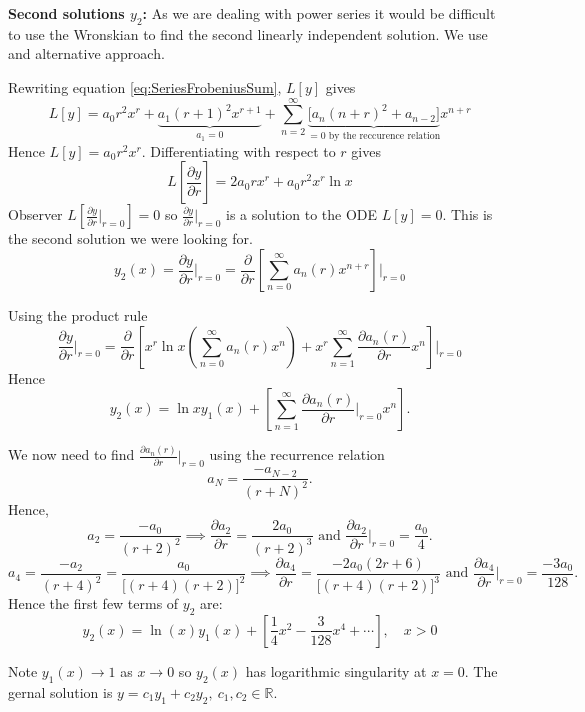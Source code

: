 \documentclass{article}
\theoremstyle{plain}
\theoremstyle{definition}
\numberwithin{equation}{section}
\begin{document}
\begin{tcolorbox}
        \textbf{Second solutions $y_2$:} As we are dealing with power series it would be difficult to use the Wronskian to find the second linearly independent solution. We use and alternative approach.

        Rewriting equation \eqref{eq:SeriesFrobeniusSum}, $L[y]$ gives 
        \[
            L[y] = a_0r^2x^r+
            \underbrace{a_1(r+1)^2x^{r+1}}_{a_1=0}
             + \sum_{n=2}^{\infty}
                 \underbrace{\Big[ a_n(n+r)^2 + a_{n-2}\Big]}_{=0 \text{ by the reccurence relation}} 
                 x^{n+r}
        \]
        Hence $L[y] = a_0r^2x^r $.
        Differentiating with respect to $r$ gives
        \[
            L\left[\frac{\partial y}{\partial r}\right] = 2a_0rx^r + a_0r^2x^r\ln x
        \]
        Observer $L\left[ \frac{\partial y}{\partial r} \Big \vert_{r=0} \right] = 0$ so $\frac{\partial y}{\partial r} \Big \vert_{r=0}$ is a solution to the ODE $L[y]=0$. This is the second solution we were looking for.
        \[ y_2(x) = \frac{\partial y}{\partial r} \Big \vert_{r=0} = \frac{\partial }{\partial r} \left[ \sum_{n=0}^{\infty} a_n(r)x^{n+r} \right] \Bigg \vert_{r=0} \]

        Using the product rule
        \[ \frac{\partial y}{\partial r} \Big \vert_{r=0} = \frac{\partial }{\partial r} \left[ x^r \ln x \left( \sum_{n=0}^{\infty} a_n(r)x^n \right)+ x^r \sum_{n=1}^{\infty} \frac{\partial a_n(r)}{\partial r}x^{n} \right] \Bigg \vert_{r=0} \]
        Hence
        \[
            y_2(x) = \ln x y_1(x) + \left[ \sum_{n=1}^{\infty} \frac{\partial a_n(r)}{\partial r}\Big \vert_{r=0} x^{n} \right].
        \]
        
        We now need to find $ \frac{\partial a_n(r)}{\partial r}\Big \vert_{r=0}$ using the recurrence relation
        \[
            a_N = \frac{-a_{N-2}}{(r+N)^2}.
        \]
        Hence,
        \[ a_2=\frac{-a_0}{(r+2)^2} \implies \frac{\partial a_2}{\partial r} = \frac{2a_0}{(r+2)^3} \text{ and } \frac{\partial a_2}{\partial r} \Big \vert_{r=0} = \frac{a_0}{4}.
        \]
        \[
            a_4 = \frac{-a_2}{(r+4)^2} = \frac{a_0}{\big[ (r+4)(r+2)\big]^2} \implies \frac{\partial a_4}{\partial r} = \frac{-2a_0(2r+6)}{\big[(r+4)(r+2)\big]^3} \text{ and } \frac{\partial a_4}{\partial r} \Big \vert_{r=0} = \frac{-3a_0}{128}.
        \]
        Hence the first few terms of $y_2$ are:
        \[ y_2(x) = \ln(x)y_1(x) + \left[ \frac{1}{4}x^2 - \frac{3}{128}x^4 + \cdots \right], \quad x>0 \]

        Note $y_1(x)\to1$ as $x\to 0$ so $y_2(x)$ has logarithmic singularity at $x=0$. The gernal solution is $y=c_1y_1 + c_2y_2, \ c_1,c_2 \in \mathbb{R}$.
        

\end{tcolorbox}
\end{document}
